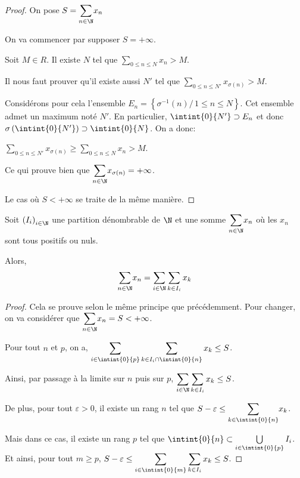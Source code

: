 \begin{proof}
On pose $S=\displaystyle{\sum \limits_{n \in \N}} x_n$

On va commencer par supposer $S=+\infty$.

Soit $M \in R$. Il existe $N$ tel que $\displaystyle{\sum \limits_{0 \leq n \leq N}} x_n > M$. 

Il nous faut prouver qu'il existe aussi $N'$ tel que $\displaystyle{\sum \limits_{0 \leq n \leq N'}} x_{\sigma(n)} > M$.

Considérons pour cela l'ensemble $E_n = \left\{\sigma^{-1}(n)/ \, 1 \leq n \leq N\right\}$. Cet ensemble admet un maximum noté $N'$. En particulier, $\intint{0}{N'} \supset E_n$ et donc $\sigma\left(\intint{0}{N'}\right) \supset \intint{0}{N}$. On a donc:

$\displaystyle{\sum \limits_{0 \leq n \leq N'}} x_{\sigma(n)} \geq \displaystyle{\sum \limits_{0 \leq n \leq N}} x_n > M$.

Ce qui prouve bien que $\displaystyle{\sum \limits_{n \in \N}} x_{\sigma(n)} = +\infty$.

Le cas où $S<+\infty$ se traite de la même manière.
\end{proof}

\begin{prop}
Soit $\left(I_i\right)_{i \in \N}$ une partition dénombrable de $\N$ et une somme $\displaystyle{\sum \limits_{n \in \N}} x_n$ où les $x_n$ sont tous positifs ou nuls.

Alors,
\[
\displaystyle{\sum \limits_{n \in \N}} x_n = \displaystyle{\sum \limits_{i \in \N}} \sum \limits_{k \in I_i} x_k
\]
\end{prop}

\begin{proof}
Cela se prouve selon le même principe que précédemment. Pour changer, on va considérer que $\displaystyle{\sum \limits_{n \in \N}} x_n = S < +\infty$.

Pour tout $n$ et $p$, on a, $\displaystyle{\sum \limits_{i \in \intint{0}{p}}} \sum \limits_{k \in I_i \cap \intint{0}{n}} x_k \leq S$.

Ainsi, par passage à la limite sur $n$ puis sur $p$, $\displaystyle{\sum \limits_{i \in \N}} \sum \limits_{k \in I_i} x_k \leq S$.

De plus, pour tout $\varepsilon > 0$, il existe un rang $n$ tel que $S-\varepsilon \leq \displaystyle{\sum \limits_{k \in \intint{0}{n}}} x_k$. 

Mais dans ce cas, il existe un rang $p$ tel que $\intint{0}{n} \subset \bigcup \limits_{i \in \intint{0}{p}} I_i$. Et ainsi, pour tout $m \geq p$, $S-\varepsilon \leq \displaystyle{\sum \limits_{i \in \intint{0}{m}}} \sum \limits_{k \in I_i} x_k \leq S$.
\end{proof}


